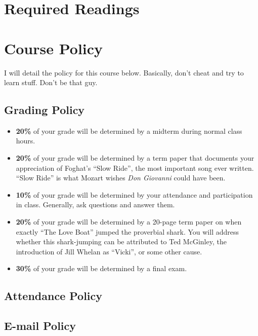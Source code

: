 \documentclass[11pt,]{article}
\begin{document}
\hypertarget{required-readings}{%
\section{Required Readings}\label{required-readings}}

\hypertarget{course-policy}{%
\section{Course Policy}\label{course-policy}}

I will detail the policy for this course below. Basically, don't cheat
and try to learn stuff. Don't be that guy.

\hypertarget{grading-policy}{%
\subsection{Grading Policy}\label{grading-policy}}

\begin{itemize}
\item
  \textbf{20\%} of your grade will be determined by a midterm during
  normal class hours.
\item
  \textbf{20\%} of your grade will be determined by a term paper that
  documents your appreciation of Foghat's ``Slow Ride'', the most
  important song ever written. ``Slow Ride'' is what Mozart wishes
  \emph{Don Giovanni} could have been.
\item
  \textbf{10\%} of your grade will be determined by your attendance and
  participation in class. Generally, ask questions and answer them.
\item
  \textbf{20\%} of your grade will be determined by a 20-page term paper
  on when exactly ``The Love Boat'' jumped the proverbial shark. You
  will address whether this shark-jumping can be attributed to Ted
  McGinley, the introduction of Jill Whelan as ``Vicki'', or some other
  cause.
\item
  \textbf{30\%} of your grade will be determined by a final exam.
\end{itemize}

\hypertarget{attendance-policy}{%
\subsection{Attendance Policy}\label{attendance-policy}}

\hypertarget{e-mail-policy}{%
\subsection{E-mail Policy}\label{e-mail-policy}}
\end{document}
